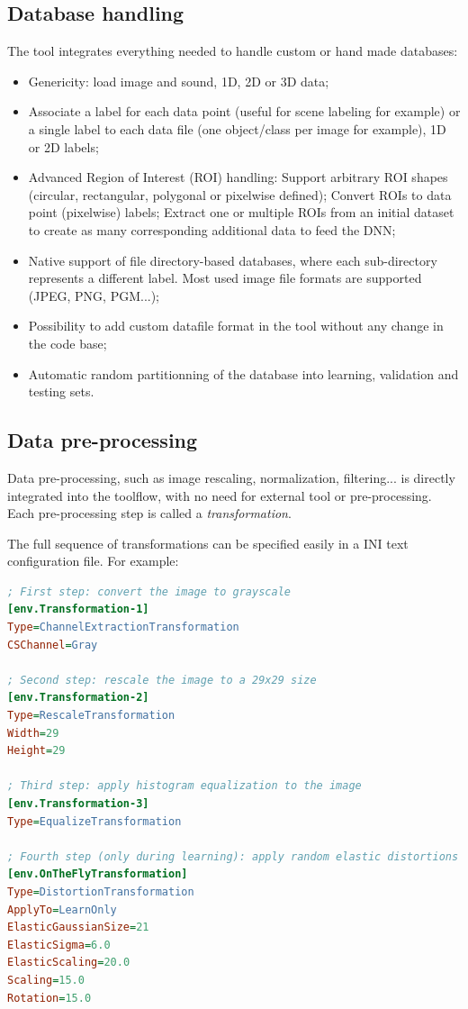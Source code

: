 \documentclass[a4paper,11pt,oneside]{article}
\newenvironment{myitemize}
{ \begin{itemize}
    \setlength{\itemsep}{0pt}
    \setlength{\parskip}{0pt}
    \setlength{\parsep}{0pt}     }
{ \end{itemize}                  }
\begin{document}
\subsection{Database handling}

The tool integrates everything needed to handle custom or hand made databases:
\begin{myitemize}
    \item Genericity: load image and sound, 1D, 2D or 3D data;
    \item Associate a label for each data point (useful for scene labeling for
    example) or a single label to each data file (one object/class per image for
     example), 1D or 2D labels;
    \item Advanced Region of Interest (ROI) handling:
    \subitem Support arbitrary ROI shapes (circular, rectangular, polygonal or
    pixelwise defined);
    \subitem Convert ROIs to data point (pixelwise) labels;
    \subitem Extract one or multiple ROIs from an initial dataset to create as
    many corresponding additional data to feed the DNN;
    \item Native support of file directory-based databases, where each
    sub-directory represents a different label. Most used image file formats are
     supported (JPEG, PNG, PGM...);
    \item Possibility to add custom datafile format in the tool without any
    change in the code base;
    \item Automatic random partitionning of the database into learning,
    validation and testing sets.
\end{myitemize}


\subsection{Data pre-processing}

Data pre-processing, such as image rescaling, normalization, filtering... is
 directly integrated into the toolflow, with no need for external tool or
  pre-processing.
Each pre-processing step is called a \emph{transformation}.

The full sequence of transformations can be specified easily in a INI text
configuration file. For example:
\begin{lstlisting}[language=ini]
; First step: convert the image to grayscale
[env.Transformation-1]
Type=ChannelExtractionTransformation
CSChannel=Gray

; Second step: rescale the image to a 29x29 size
[env.Transformation-2]
Type=RescaleTransformation
Width=29
Height=29

; Third step: apply histogram equalization to the image
[env.Transformation-3]
Type=EqualizeTransformation

; Fourth step (only during learning): apply random elastic distortions to the images to extent the learning set
[env.OnTheFlyTransformation]
Type=DistortionTransformation
ApplyTo=LearnOnly
ElasticGaussianSize=21
ElasticSigma=6.0
ElasticScaling=20.0
Scaling=15.0
Rotation=15.0
\end{lstlisting}
\end{document}
